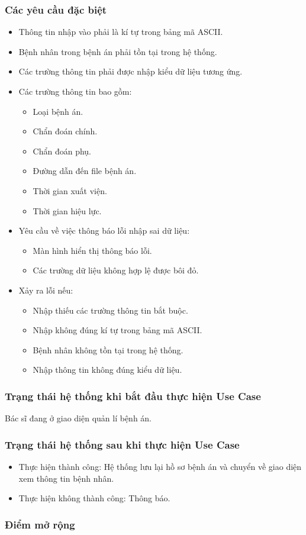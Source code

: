 \subsubsection{Các yêu cầu đặc biệt}
\begin{itemize}
  \item Thông tin nhập vào phải là kí tự trong bảng mã ASCII.
  \item Bệnh nhân trong bệnh án phải tồn tại trong hệ thống.
  \item Các trường thông tin phải được nhập kiểu dữ liệu tương ứng.
  \item Các trường thông tin bao gồm:
    \begin{itemize}
      \item Loại bệnh án.
      \item Chẩn đoán chính.
      \item Chẩn đoán phụ.
      \item Đường dẫn đến file bệnh án.
      \item Thời gian xuất viện.
      \item Thời gian hiệu lực.
    \end{itemize}
  \item Yêu cầu về việc thông báo lỗi nhập sai dữ liệu:
    \begin{itemize}
      \item Màn hình hiển thị thông báo lỗi.
      \item Các trường dữ liệu không hợp lệ được bôi đỏ.
    \end{itemize}
  \item Xảy ra lỗi nếu:
    \begin{itemize}
      \item Nhập thiếu các trường thông tin bắt buộc.
      \item Nhập không đúng kí tự trong bảng mã ASCII.
      \item Bệnh nhân không tồn tại trong hệ thống.
      \item Nhập thông tin không đúng kiểu dữ liệu.
    \end{itemize}
\end{itemize}

\subsubsection{Trạng thái hệ thống khi bắt đầu thực hiện Use Case}
Bác sĩ đang ở giao diện quản lí bệnh án.

\subsubsection{Trạng thái hệ thống sau khi thực hiện Use Case}
\begin{itemize}
  \item Thực hiện thành công: Hệ thống lưu lại hồ sơ bệnh án và chuyển về giao diện xem thông tin bệnh nhân.
  \item Thực hiện không thành công: Thông báo.
\end{itemize}

\subsubsection{Điểm mở rộng}